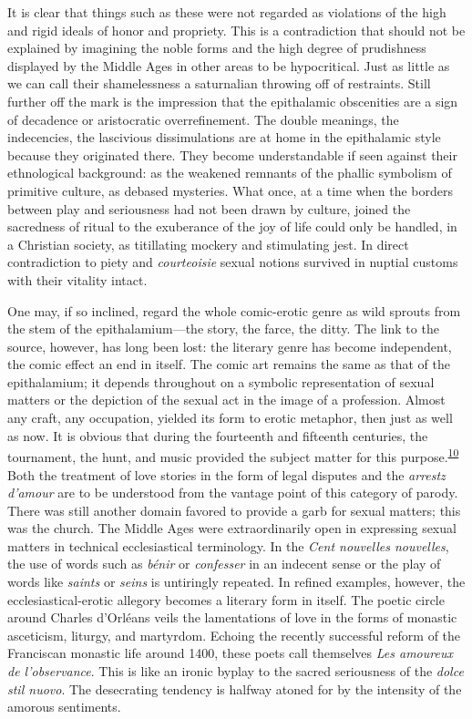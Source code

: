 It is clear that things such as these were not regarded as violations of
the high and rigid ideals of honor and propriety. This is a
contradiction that should not be explained by imagining the noble forms
and the high degree of prudishness displayed by the Middle Ages in other
areas to be hypocritical. Just as little as we can call their
shamelessness a saturnalian throwing off of restraints. Still further
off the mark is the impression that the epithalamic obscenities are a
sign of decadence or aristocratic overrefinement. The double meanings,
the indecencies, the lascivious dissimulations are at home in the
epithalamic style because they originated there. They become
understandable if seen against their ethnological background: as the
weakened remnants of the phallic symbolism of primitive culture, as
debased mysteries. What once, at a time when the borders between play
and seriousness had not been drawn by culture, joined the sacredness of
ritual to the exuberance of the joy of life could only be handled, in a
Christian society, as titillating mockery and stimulating jest. In
direct contradiction to piety and \emph{courteoisie} sexual notions
survived in nuptial customs with their vitality intact.

One may, if so inclined, regard the whole comic-erotic genre as wild
sprouts from the stem of the epithalamium---the story, the farce, the
ditty. The link to the source, however, has long been lost: the literary
genre has become independent, the comic effect an end in itself. The
comic art remains the same as that of the epithalamium; it depends
throughout on a symbolic representation of sexual matters or the
depiction of the sexual act in the image of a profession. Almost any
craft, any occupation, yielded its form to erotic metaphor, then just as
well as now. It is obvious that during the fourteenth and fifteenth
centuries, the tournament, the hunt, and music provided the subject
matter for this
purpose.\textsuperscript{\protect\hypertarget{11_Chapter_Four__THE_FORMS_OF_LOVE.xhtmlux5cux23id_1468}{\protect\hyperlink{23_NOTES.xhtmlux5cux23id_1469}{10}}}
Both the
\protect\hypertarget{11_Chapter_Four__THE_FORMS_OF_LOVE.xhtmlux5cux23page_131}{}{}treatment
of love stories in the form of legal disputes and the \emph{arrestz
d'amour} are to be understood from the vantage point of this category of
parody. There was still another domain favored to provide a garb for
sexual matters; this was the church. The Middle Ages were
extraordinarily open in expressing sexual matters in technical
ecclesiastical terminology. In the \emph{Cent nouvelles nouvelles}, the
use of words such as \emph{bénir} or \emph{confesser} in an indecent
sense or the play of words like \emph{saints} or \emph{seins} is
untiringly repeated. In refined examples, however, the
ecclesiastical-erotic allegory becomes a literary form in itself. The
poetic circle around Charles d'Orléans veils the lamentations of love in
the forms of monastic asceticism, liturgy, and martyrdom. Echoing the
recently successful reform of the Franciscan monastic life around 1400,
these poets call themselves \emph{Les amoureux de l'observance}. This is
like an ironic byplay to the sacred seriousness of the \emph{dolce stil
nuovo}. The desecrating tendency is halfway atoned for by the intensity
of the amorous sentiments.

